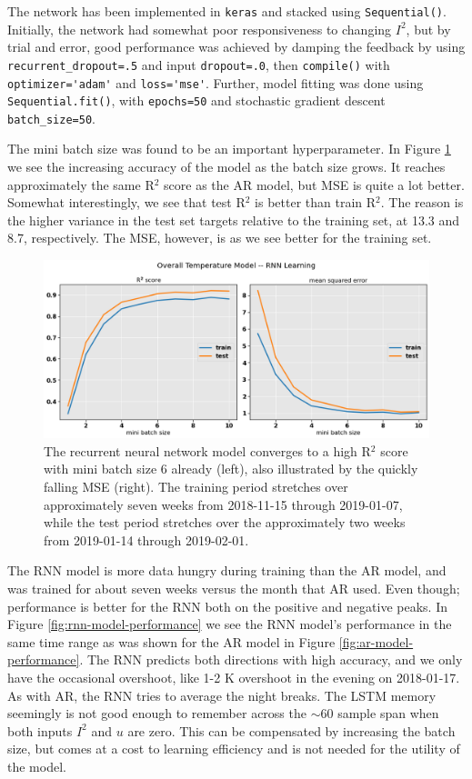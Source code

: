 \documentclass[]{article}
\begin{document}
The network has been implemented in \lstinline|keras| and stacked using \lstinline|Sequential()|. Initially, the network had somewhat poor responsiveness to changing $I^2$, but by trial and error, good performance was achieved by damping the feedback by using \lstinline|recurrent_dropout=.5| and input \lstinline|dropout=.0|, then \lstinline|compile()| with \lstinline|optimizer='adam'| and \lstinline|loss='mse'|. Further, model fitting was done using \lstinline|Sequential.fit()|, with \lstinline|epochs=50| and stochastic gradient descent \lstinline|batch_size=50|.

The mini batch size was found to be an important hyperparameter. In Figure \ref{fig:rnn-model-learning} we see the increasing accuracy of the model as the batch size grows. It reaches approximately the same R$^2$ score as the AR model, but MSE is quite a lot better. Somewhat interestingly, we see that test R$^2$ is better than train R$^2$. The reason is the higher variance in the test set targets relative to the training set, at 13.3 and 8.7, respectively. The MSE, however, is as we see better for the training set.

\begin{figure}[!h]
	\centering
	\includegraphics[width=1\linewidth]{./figs/rnn-model-learning.png}
	\caption{The recurrent neural network model converges to a high R$^2$ score with mini batch size 6 already (left), also illustrated by the quickly falling MSE (right). The training period stretches over approximately seven weeks from 2018-11-15 through 2019-01-07, while the test period stretches over the approximately two weeks from 2019-01-14 through 2019-02-01.}
	\label{fig:rnn-model-learning}
\end{figure}

The RNN model is more data hungry during training than the AR model, and was trained for about seven weeks versus the month that AR used. Even though; performance is better for the RNN both on the positive and negative peaks. In Figure \ref{fig:rnn-model-performance} we see the RNN model's performance in the same time range as was shown for the AR model in Figure \ref{fig:ar-model-performance}. The RNN predicts both directions with high accuracy, and we only have the occasional overshoot, like 1-2 K overshoot in the evening on 2018-01-17. As with AR, the RNN tries to average the night breaks. The LSTM memory seemingly is not good enough to remember across the $\sim 60$ sample span when both inputs $I^2$ and $u$ are zero. This can be compensated by increasing the batch size, but comes at a cost to learning efficiency and is not needed for the utility of the model.
\end{document}
